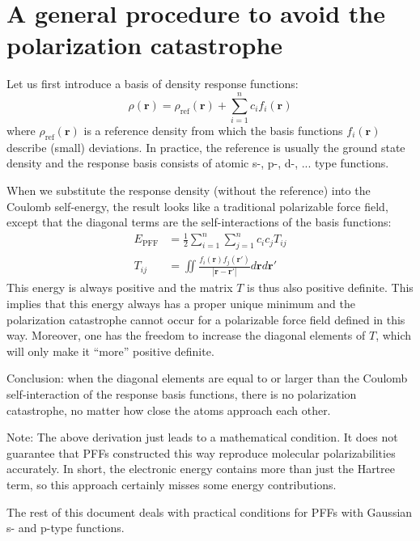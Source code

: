 \documentclass[a4paper,12pt,parskip=half]{scrartcl}
\begin{document}
\section{A general procedure to avoid the polarization catastrophe}

Let us first introduce a basis of density response functions:
%
\begin{equation}
    \rho(\mathbold{r}) = \rho_\text{ref}(\mathbold{r}) + \sum_{i=1}^n c_i f_i(\mathbold{r})
\end{equation}
%
where $\rho_\text{ref}(\mathbold{r})$ is a reference density from which the basis functions $f_i(\mathbold{r})$ describe (small) deviations. In practice, the reference is usually the ground state density and the response basis consists of atomic s-, p-, d-, ... type functions.

When we substitute the response density (without the reference) into the Coulomb self-energy, the result looks like a traditional polarizable force field, except that the diagonal terms are the self-interactions of the basis functions:
%
\begin{align}
    E_\text{PFF} &= \frac{1}{2} \sum_{i=1}^n \sum_{j=1}^n c_i c_j T_{ij} \\
    \label{eq:pff_matrix}
    T_{ij} &= \iint \frac{ f_i(\mathbold{r}) f_j(\mathbold{r}') }{| \mathbold{r} - \mathbold{r}' |} d\mathbold{r} d\mathbold{r}'
\end{align}
%
This energy is always positive and the matrix $T$ is thus also positive definite. This implies that this energy always has a proper unique minimum and the polarization catastrophe cannot occur for a polarizable force field defined in this way. Moreover, one has the freedom to increase the diagonal elements of $T$, which will only make it ``more'' positive definite.

Conclusion: when the diagonal elements are equal to or larger than the Coulomb self-interaction of the response basis functions, there is no polarization catastrophe, no matter how close the atoms approach each other.

Note: The above derivation just leads to a mathematical condition. It does not guarantee that PFFs constructed this way reproduce molecular polarizabilities accurately. In short, the electronic energy contains more than just the Hartree term, so this approach certainly misses some energy contributions.

The rest of this document deals with practical conditions for PFFs with Gaussian s- and p-type functions.
\end{document}

